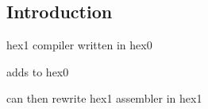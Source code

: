 
\subsection{Introduction}

hex1 compiler written in hex0

adds to hex0

can then rewrite hex1 assembler in hex1

